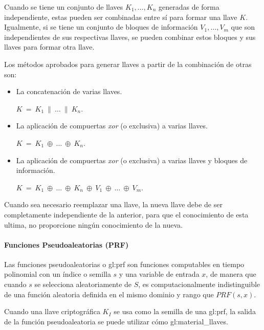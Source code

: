 Cuando se tiene un conjunto de llaves $K_1, \dots, K_n$ generadas de forma 
independiente, estas pueden ser combinadas entre sí para formar una llave $K$. 
Igualmente, si se tiene un conjunto de bloques de información $V_1, \dots, 
V_m$ que son independientes de sus respectivas llaves, se pueden combinar 
estos bloques y sus llaves para formar otra llave. 

Los métodos aprobados para generar llaves a partir de la combinación de 
otras son: 
\begin{itemize}

  \item La concatenación de varias llaves.

  $K\: =\: K_1\: \parallel\: \dots\: \parallel\: K_n$.

  \item La aplicación de compuertas \textit{xor} (o exclusiva) a varias llaves.

  $K\: =\: K_1\: \oplus\: \dots\: \oplus\: K_n$.
  
  \item La aplicación de compuertas \textit{xor} (o exclusiva) a varias llaves 
  y bloques de información.

  $K\: =\: K_1\: \oplus\: \dots\: \oplus\: K_n\: 
  \oplus\: V_1\: \oplus\: \dots\: \oplus\: V_m$.

\end{itemize}

Cuando sea necesario reemplazar una llave, la nueva llave debe de ser 
completamente independiente de la anterior, para que el conocimiento de esta 
ultima, no proporcione ningún conocimiento de la nueva.


\paragraph{Funciones Pseudoaleatorias (PRF)}

Las funciones pseudoaleatorias o \gls{gl:prf} son funciones computables en 
tiempo polinomial con un índice o semilla $s$ y una variable de entrada $x$, 
de manera que cuando $s$ se selecciona aleatoriamente de $S$, es 
computacionalmente indistinguible de una función aleatoria definida en el 
mismo dominio y rango que $PRF(s,x)$.

Cuando una llave criptográfica $K_I$ se usa como la semilla de una 
\gls{gl:prf}, la salida de la función pseudoaleatoria se puede utilizar 
cómo \gls{gl:material_llaves}.

